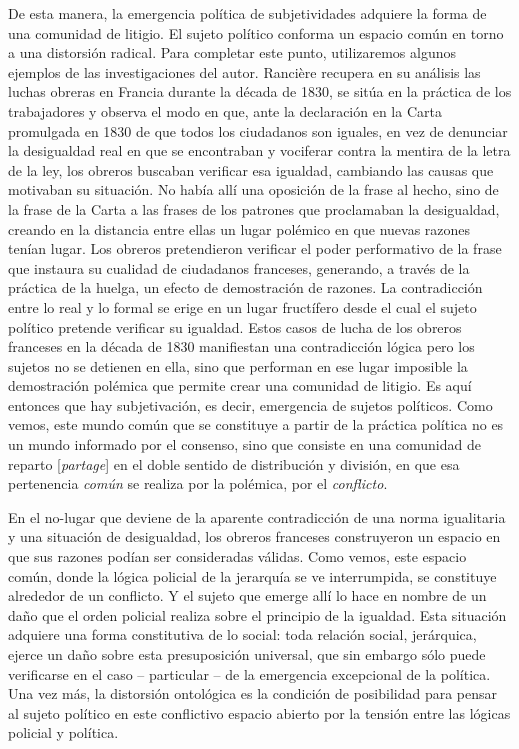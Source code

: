 De esta manera, la emergencia política de subjetividades adquiere la forma de una comunidad de litigio. El sujeto político conforma un espacio común en torno a una distorsión radical. Para completar este punto, utilizaremos algunos ejemplos de las investigaciones del autor. Rancière recupera en su análisis las luchas obreras en Francia durante la década de 1830, se sitúa en la práctica de los trabajadores y observa el modo en que, ante la declaración en la Carta promulgada en 1830 de que todos los ciudadanos son iguales, en vez de denunciar la desigualdad real en que se encontraban y vociferar contra la mentira de la letra de la ley, los obreros buscaban verificar esa igualdad, cambiando las causas que motivaban su situación. No había allí una oposición de la frase al hecho, sino de la frase de la Carta a las frases de los patrones que proclamaban la desigualdad, creando en la distancia entre ellas un lugar polémico en que nuevas razones tenían lugar. Los obreros pretendieron verificar el poder performativo de la frase que instaura su cualidad de ciudadanos franceses, generando, a través de la práctica de la huelga, un efecto de demostración de razones. La contradicción entre lo real y lo formal se erige en un lugar fructífero desde el cual el sujeto político pretende verificar su igualdad. Estos casos de lucha de los obreros franceses en la década de 1830 manifiestan una contradicción lógica pero los sujetos no se detienen en ella, sino que performan en ese lugar imposible la demostración polémica que permite crear una comunidad de litigio. Es aquí entonces que hay subjetivación, es decir, emergencia de sujetos políticos. Como vemos, este mundo común que se constituye a partir de la práctica política no es un mundo informado por el consenso, sino que consiste en una comunidad de reparto {[}\emph{partage}{]} en el doble sentido de distribución y división, en que esa pertenencia \emph{común} se realiza por la polémica, por el \emph{conflicto}.

En el no-lugar que deviene de la aparente contradicción de una norma igualitaria y una situación de desigualdad, los obreros franceses construyeron un espacio en que sus razones podían ser consideradas válidas. Como vemos, este espacio común, donde la lógica policial de la jerarquía se ve interrumpida, se constituye alrededor de un conflicto. Y el sujeto que emerge allí lo hace en nombre de un daño que el orden policial realiza sobre el principio de la igualdad. Esta situación adquiere una forma constitutiva de lo social: toda relación social, jerárquica, ejerce un daño sobre esta presuposición universal, que sin embargo sólo puede verificarse en el caso -- particular -- de la emergencia excepcional de la política. Una vez más, la distorsión ontológica es la condición de posibilidad para pensar al sujeto político en este conflictivo espacio abierto por la tensión entre las lógicas policial y política.

